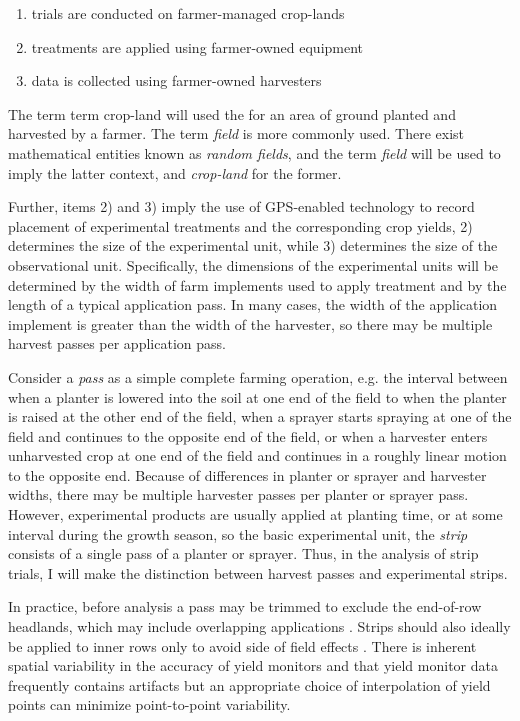 \documentclass[phdcss]{SDSUThesis}
\begin{document}
\begin{enumerate}
 \item trials are conducted on farmer-managed crop-lands
 \item treatments are applied using farmer-owned equipment  
 \item data is collected using farmer-owned harvesters 
\end{enumerate}

The term term crop-land will used the for an area of ground planted and harvested by a farmer. The term \textit{field} is more commonly used. There exist mathematical entities known as \textit{random fields}, and the term  \textit{field} will be used to imply the latter context, and \textit{crop-land} for the former.

Further, items 2) and 3) imply the use of GPS-enabled technology to record placement of experimental treatments and the corresponding crop yields, 2) determines the size of the experimental unit, while 3) determines the size of the observational unit. Specifically, the dimensions of the experimental units will be determined by the width of farm implements used to apply treatment and by the length of a typical application pass. In many cases, the width of the application implement is greater than the width of the harvester, so there may be multiple harvest passes per application pass. 

Consider a \textit{pass} as a simple complete farming operation, e.g. the interval between when a planter is lowered into the soil at one end of the field to when the planter is raised at the other end of the field, when a sprayer starts spraying at one of the field and continues to the opposite end of the field, or when a harvester enters unharvested crop at one end of the field and continues in a roughly linear motion to the opposite end. Because of differences in planter or sprayer and harvester widths, there may be multiple harvester passes per planter or sprayer pass. However, experimental products are usually applied at planting time, or at some interval during the growth season, so the basic experimental unit, the \textit{strip} consists of a single pass of a planter or sprayer. Thus, in the analysis of strip trials, I will make the distinction between harvest passes and experimental strips.

In practice, before analysis a pass may be trimmed to exclude the end-of-row headlands, which may include overlapping applications \cite{bullock-11-2019}. Strips should also ideally be applied to inner rows only to avoid side of field effects \cite{bullock-11-2019}. There is inherent spatial variability in the accuracy of yield monitors \cite{gauci-12-2023} and that yield monitor data frequently contains artifacts \cite{marchant-2019} but an appropriate choice of interpolation of yield points can minimize point-to-point variability.
\end{document}
